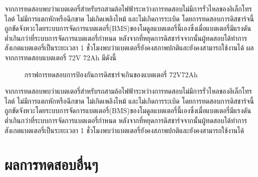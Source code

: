 \hspace*{2cm}
จากการทดสอบพบว่าแบตเตอรี่สำหรับรถสามล้อไฟฟ้าระหว่างการทดสอบไม่มีการรั่วไหลของอิเล็กโทรไลต์ ไม่มีการแตกหักหรือฉีกขาด ไม่เกิดเพลิงไหม้ และไม่เกิดการระเบิด
โดยการทดสอบการดิสชาร์จนี้ถูกขัดจังหวะโดยระบบการจัดการแบตเตอรี่(BMS)ของโมดูลแบตเตอรี่นี้เองซึ่งเมื่อแบตเตอรี่มีแรงดันต่ำเกินกว่าที่ระบบการจัดการแบตเตอรี่กำหนด
หลังจากที่หยุดการดิสชาร์จจากนั้นผู้ทดสอบได้ทำการสังเกตแบตเตอรี่เป็นระยะเวลา 1 ชั่วโมงพบว่าแบตเตอรี่ยังคงสภาพปกติและยังคงสามารถใช้งานได้
\newline\hspace*{2cm}
ผลจากการทดสอบแบตเตอรี่ 72V 72Ah มีดังนี้
\begin{center}
	\begin{figure}[H]
		\centering
		\captionsetup{justification=centering,margin=2cm}
		\caption{กราฟการทดสอบการป้องกันการดิสชาร์จเกินของแบตเตอรี่ 72V72Ah}
	\end{figure}
\end{center}
\hspace*{2cm}
จากการทดสอบพบว่าแบตเตอรี่สำหรับรถสามล้อไฟฟ้าระหว่างการทดสอบไม่มีการรั่วไหลของอิเล็กโทรไลต์ ไม่มีการแตกหักหรือฉีกขาด ไม่เกิดเพลิงไหม้ และไม่เกิดการระเบิด
โดยการทดสอบการดิสชาร์จนี้ถูกขัดจังหวะโดยระบบการจัดการแบตเตอรี่(BMS)ของโมดูลแบตเตอรี่นี้เองซึ่งเมื่อแบตเตอรี่มีแรงดันต่ำเกินกว่าที่ระบบการจัดการแบตเตอรี่กำหนด
หลังจากที่หยุดการดิสชาร์จจากนั้นผู้ทดสอบได้ทำการสังเกตแบตเตอรี่เป็นระยะเวลา 1 ชั่วโมงพบว่าแบตเตอรี่ยังคงสภาพปกติและยังคงสามารถใช้งานได้
\section{ผลการทดสอบอื่นๆ}
